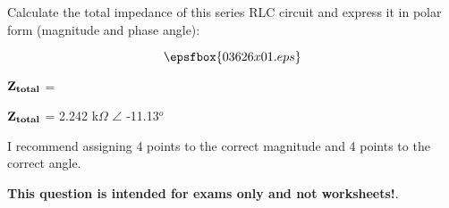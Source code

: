 

Calculate the total impedance of this series RLC circuit and express it in polar form (magnitude and phase angle):

$$\epsfbox{03626x01.eps}$$

${\bf Z_{total}}$ = 







${\bf Z_{total}}$ = 2.242 k$\Omega$ $\angle$ -11.13$^{o}$

\vskip 10pt

I recommend assigning 4 points to the correct magnitude and 4 points to the correct angle.







{\bf This question is intended for exams only and not worksheets!}.



